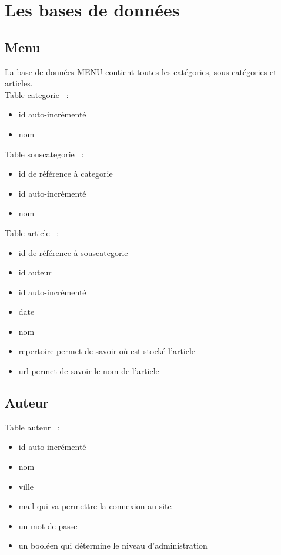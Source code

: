 \documentclass[hidelinks, 12pt,a4paper]{article}
\begin{document}
\newpage
\section{Les bases de données}
\subsection{Menu}
La base de données MENU contient toutes les catégories, sous-catégories et articles.\\

Table categorie ~:
\begin{itemize}
\item id auto-incrémenté
\item nom\\
\end{itemize}

Table souscategorie ~:
\begin{itemize}
\item id de référence à categorie
\item id auto-incrémenté
\item nom\\
\end{itemize}

Table article ~: 
\begin{itemize}
\item id de référence à souscategorie
\item id auteur
\item id auto-incrémenté
\item date
\item nom
\item repertoire permet de savoir où est stocké l'article
\item url permet de savoir le nom de l'article\\
\end{itemize}

\subsection{Auteur}

Table auteur ~:
\begin{itemize}
\item id auto-incrémenté
\item nom
\item ville
\item mail qui va permettre la connexion au site
\item un mot de passe
\item un booléen qui détermine le niveau d'administration\\
\end{itemize}
\end{document}
